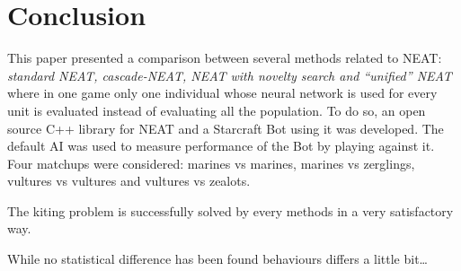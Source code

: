 \section{Conclusion}\label{section:conclusion}

This paper presented a comparison between several methods related to NEAT:
\emph{standard NEAT, cascade-NEAT, NEAT with novelty search and ``unified'' NEAT} where
in one game only one individual whose neural network is used for every unit is evaluated
instead of evaluating all the population.
To do so, an open source C++ library for NEAT and a Starcraft Bot using it was developed.
The default AI was used to measure performance of the Bot by playing against it.
Four matchups were considered: marines vs marines, marines vs zerglings, vultures vs vultures
and vultures vs zealots.

The kiting problem is successfully solved by every methods in a very satisfactory way.

While no statistical difference has been found behaviours differs a little bit…

